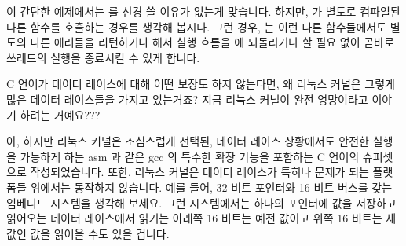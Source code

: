 \begin{enumerate}

\QuickA{}
	이 간단한 예제에서는  를 신경 쓸 이유가 없는게
	맞습니다.
	하지만,  가 별도로 컴파일된 다른 함수를 호출하는 경우를
	생각해 봅시다.
	그런 경우,  는 이런 다른 함수들에서도 별도의 다른
	에러들을 리턴하거나 해서 실행 흐름을  에 되돌리거나 할
	필요 없이 곧바로 쓰레드의 실행을 종료시킬 수 있게 합니다.

\QuickQ{}
	C 언어가 데이터 레이스에 대해 어떤 보장도 하지 않는다면, 왜 리눅스
	커널은 그렇게 많은 데이터 레이스들을 가지고 있는거죠?
	지금 리눅스 커널이 완전 엉망이라고 이야기 하려는 거예요???

\QuickA{}
	아, 하지만 리눅스 커널은 조심스럽게 선택된, 데이터 레이스 상황에서도
	안전한 실행을 가능하게 하는 asm 과 같은 gcc 의 특수한 확장 기능을
	포함하는 C 언어의 슈퍼셋으로 작성되었습니다.
	또한, 리눅스 커널은 데이터 레이스가 특히나 문제가 되는 플랫폼들
	위에서는 동작하지 않습니다.
	예를 들어, 32 비트 포인터와 16 비트 버스를 갖는 임베디드 시스템을
	생각해 보세요.
	그런 시스템에서는 하나의 포인터에 값을 저장하고 읽어오는 데이터
	레이스에서 읽기는 아래쪽 16 비트는 예전 값이고 위쪽 16 비트는 새 값인
	값을 읽어올 수도 있을 겁니다.

\end{enumerate}
